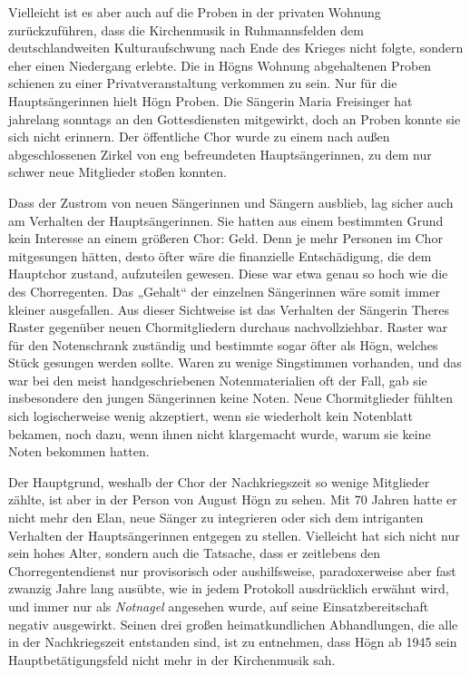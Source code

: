 \documentclass{book}
\begin{document}
Vielleicht ist es aber auch auf die Proben in der privaten Wohnung
zu\-rückzuführen, dass die Kirchenmusik in Ruhmannsfelden dem
deutschland\-weiten Kulturaufschwung nach Ende des Krieges nicht
folgte, sondern eher einen Niedergang erlebte. Die in Högns Wohnung
abgehaltenen Proben schienen zu einer Privatveranstaltung verkommen zu
sein. Nur für die Haupt\-sängerinnen hielt Högn Proben. Die Sängerin
Maria Freisinger hat jahrelang sonntags an den Gottesdiensten
mitgewirkt, doch an Proben konnte sie sich nicht erinnern. Der
öffentliche Chor wurde zu einem nach außen abgeschlos\-senen Zirkel von
eng befreundeten Hauptsängerinnen, zu dem nur schwer neue Mitglieder
stoßen konnten.

Dass der Zustrom von neuen Sängerinnen und Sängern ausblieb, lag sicher
auch am Verhalten der Hauptsängerinnen. Sie hatten aus einem bestimmten
Grund kein Interesse an einem größeren Chor: Geld. Denn je mehr
Personen im Chor mitgesungen hätten, desto öfter wäre die finanzielle
Entschä\-digung, die dem Hauptchor zustand, aufzuteilen gewesen. Diese
war etwa ge\-nau so hoch wie die des Chorregenten. Das „Gehalt“ der
einzelnen Sängerin\-nen wäre somit immer kleiner ausgefallen. Aus
dieser Sichtweise ist das Ver\-halten der Sängerin Theres Raster
gegenüber neuen Chormitgliedern durch\-aus nachvollziehbar. Raster war
für den Notenschrank zuständig und be\-stimmte sogar öfter als Högn,
welches Stück gesungen werden sollte. Waren zu wenige Singstimmen
vorhanden, und das war bei den meist handgeschrie\-benen
Notenmaterialien oft der Fall, gab sie insbesondere den jungen
Sän\-gerinnen keine Noten. Neue Chormitglieder fühlten sich
logischerweise wenig akzeptiert, wenn sie wiederholt kein Notenblatt
bekamen, noch dazu, wenn ihnen nicht klargemacht wurde, warum sie keine
Noten bekommen hatten.

Der Hauptgrund, weshalb der Chor der Nachkriegszeit so wenige
Mitglie\-der zählte, ist aber in der Person von August Högn zu sehen.
Mit 70 Jahren hatte er nicht mehr den Elan, neue Sänger zu integrieren
oder sich dem in\-triganten Verhalten der Hauptsängerinnen entgegen zu
stellen. Vielleicht hat sich nicht nur sein hohes Alter, sondern auch
die Tatsache, dass er zeitlebens den Chorregentendienst nur
provisorisch oder aushilfsweise, paradoxerweise aber fast zwanzig Jahre
lang ausübte, wie in jedem Protokoll ausdrücklich erwähnt wird, und
immer nur als \textit{Notnagel} angesehen wurde, auf seine
Ein\-satzbereitschaft negativ ausgewirkt. Seinen drei großen
heimatkundlichen Ab\-handlungen, die alle in der Nachkriegszeit
entstanden sind, ist zu entnehmen, dass Högn ab 1945 sein
Hauptbetätigungsfeld nicht mehr in der Kirchen\-musik sah.
\end{document}
